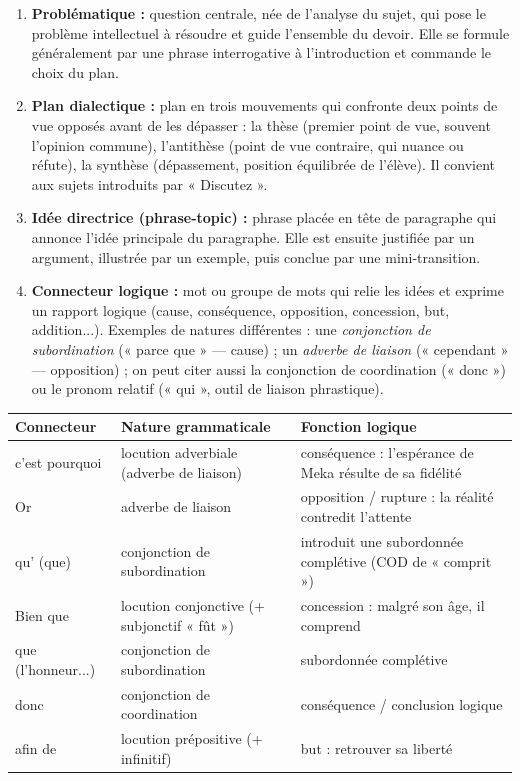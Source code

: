 \documentclass[11pt]{article}
\newcommand{\cle}[1]{{\popxbold\color{popdark}#1}}
\begin{document}
\begin{corrige}
\begin{enumerate}
\item \textbf{Problématique :} question centrale, née de l'analyse du sujet, qui pose le problème intellectuel à résoudre et guide l'ensemble du devoir. Elle se formule généralement par une phrase interrogative à l'introduction et commande le choix du plan.
\item \textbf{Plan dialectique :} plan en trois mouvements qui confronte deux points de vue opposés avant de les dépasser : la \cle{thèse} (premier point de vue, souvent l'opinion commune), l'\cle{antithèse} (point de vue contraire, qui nuance ou réfute), la \cle{synthèse} (dépassement, position équilibrée de l'élève). Il convient aux sujets introduits par « Discutez ».
\item \textbf{Idée directrice (phrase-topic) :} phrase placée en tête de paragraphe qui annonce l'idée principale du paragraphe. Elle est ensuite justifiée par un argument, illustrée par un exemple, puis conclue par une mini-transition.
\item \textbf{Connecteur logique :} mot ou groupe de mots qui relie les idées et exprime un rapport logique (cause, conséquence, opposition, concession, but, addition...). Exemples de natures différentes : une \emph{conjonction de subordination} (« parce que » — cause) ; un \emph{adverbe de liaison} (« cependant » — opposition) ; on peut citer aussi la conjonction de coordination (« donc ») ou le pronom relatif (« qui », outil de liaison phrastique).
\end{enumerate}
\end{corrige}

\begin{corrige}
\begin{center}
\begin{tabularx}{\linewidth}{|l|l|X|}\hline
\rowcolor{popblueL} \textbf{Connecteur} & \textbf{Nature grammaticale} & \textbf{Fonction logique} \\ \hline
c'est pourquoi & locution adverbiale (adverbe de liaison) & conséquence : l'espérance de Meka résulte de sa fidélité \\ \hline
Or & adverbe de liaison & opposition / rupture : la réalité contredit l'attente \\ \hline
qu' (que) & conjonction de subordination & introduit une subordonnée complétive (COD de « comprit ») \\ \hline
Bien que & locution conjonctive (+ subjonctif « fût ») & concession : malgré son âge, il comprend \\ \hline
que (l'honneur...) & conjonction de subordination & subordonnée complétive \\ \hline
donc & conjonction de coordination & conséquence / conclusion logique \\ \hline
afin de & locution prépositive (+ infinitif) & but : retrouver sa liberté \\ \hline
\end{tabularx}
\end{center}
\end{corrige}
\end{document}
